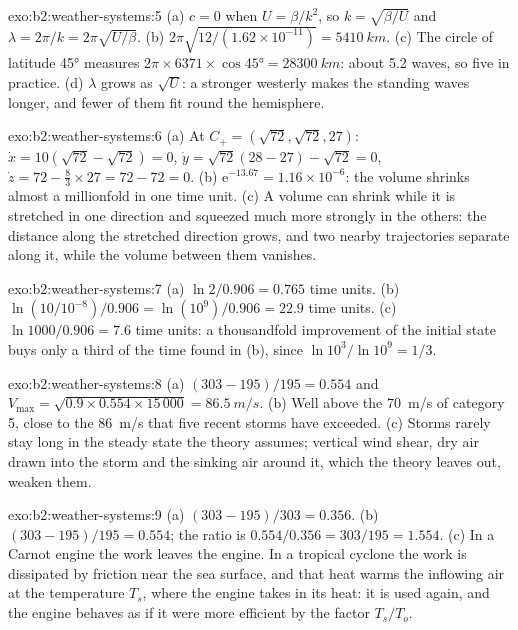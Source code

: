 \begin{solution}{exo:b2:weather-systems:5}
(a) $c = 0$ when $U = \beta/k^2$, so $k = \sqrt{\beta/U}$ and $\lambda = 2\pi/k =
2\pi\sqrt{U/\beta}$. (b) $2\pi\sqrt{12/(1.62 \times 10^{-11})} = \qty{5410}{km}$. (c) The circle
of latitude \ang{45} measures $2\pi \times 6371 \times \cos\ang{45} = \qty{28300}{km}$: about 5.2
waves, so five in practice. (d) $\lambda$ grows as $\sqrt U$: a stronger westerly makes the
standing waves longer, and fewer of them fit round the hemisphere.
\end{solution}

\begin{solution}{exo:b2:weather-systems:6}
(a) At $C_+ = (\sqrt{72}, \sqrt{72}, 27)$: $\dot x = 10(\sqrt{72} - \sqrt{72}) = 0$, $\dot y =
\sqrt{72}(28 - 27) - \sqrt{72} = 0$, $\dot z = 72 - \tfrac83 \times 27 = 72 - 72 = 0$.
(b) $\mathrm{e}^{-13.67} = 1.16 \times 10^{-6}$: the volume shrinks almost a millionfold in one
time unit. (c) A volume can shrink while it is stretched in one direction and squeezed much more
strongly in the others: the distance along the stretched direction grows, and two nearby
trajectories separate along it, while the volume between them vanishes.
\end{solution}

\begin{solution}{exo:b2:weather-systems:7}
(a) $\ln 2/0.906 = 0.765$ time units. (b) $\ln(10/10^{-8})/0.906 = \ln(10^9)/0.906 = 22.9$ time
units. (c) $\ln 1000/0.906 = 7.6$ time units: a thousandfold improvement of the initial state
buys only a third of the time found in (b), since $\ln 10^3/\ln 10^9 = 1/3$.
\end{solution}

\begin{solution}{exo:b2:weather-systems:8}
(a) $(303 - 195)/195 = 0.554$ and $V_{\max} = \sqrt{0.9 \times 0.554 \times 15\,000} =
\qty{86.5}{m/s}$. (b) Well above the \qty{70}{m/s} of category 5, close to the \qty{86}{m/s} that
five recent storms have exceeded. (c) Storms rarely stay long in the steady state the theory
assumes; vertical wind shear, dry air drawn into the storm and the sinking air around it, which
the theory leaves out, weaken them.
\end{solution}

\begin{solution}{exo:b2:weather-systems:9}
(a) $(303 - 195)/303 = 0.356$. (b) $(303 - 195)/195 = 0.554$; the ratio is $0.554/0.356 =
303/195 = 1.554$. (c) In a Carnot engine the work leaves the engine. In a tropical cyclone the
work is dissipated by friction near the sea surface, and that heat warms the inflowing air at the
temperature $T_s$, where the engine takes in its heat: it is used again, and the engine behaves
as if it were more efficient by the factor $T_s/T_o$.
\end{solution}

